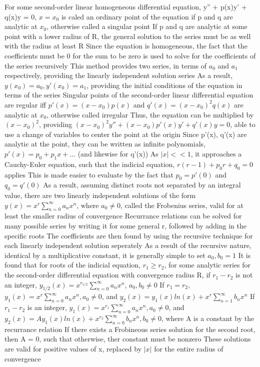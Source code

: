 \documentclass[11 pt, twoside]{article}
\newenvironment{outline*}
{
	\begin{outline}[enumerate]
	}
	{\end{outline}
}
\begin{document}
\begin{outline*}
\1 For some second-order linear homogeneous differential equation, y'' + p(x)y' + q(x)y = 0, $x = x_0$ is caled an ordinary point of the equation if p and q are analytic at $x_0$, otherwise called a singular point
	\2 If p and q are analytic at some point with a lower radius of R, the general solution to the series must be as well with the radius at least R
	\2 Since the equation is homogeneous, the fact that the coefficients must be 0 for the sum to be zero is used to solve for the coefficients of the series recursively
		\3 This method provides two series, in terms of $a_0$ and $a_1$ respectively, providing the linearly independent solution series
		\3 As a result, $y(x_0) = a_0, y'(x_0) = a_1$, providing the initial conditions of the equation in terms of the series
\1 Singular points of the second-order linear differential equation are regular iff $p'(x) = (x - x_0)p(x)$ and $q'(x) = (x - x_0)^2q(x)$ are analytic at $x_0$, otherwise called irregular
	\2 Thus, the equation can be multiplied by $(x - x_0)^2$, providing $(x - x_0)^2y'' + (x - x_0)p'(x)y' + q'(x)y = 0$, able to use a change of variables to center the point at the origin
	\2 Since p'(x), q'(x) are analytic at the point, they can be written as infinite polynomials, $p'(x) = p_0 + p_1x + ...$ (and likewise for q'(x))
		\3 As $|x| << 1$, it approaches a Cauchy-Euler equation, such that the indicial equation, $r(r - 1) + p_0r + q_0 = 0$ applies
			\4 This is made easier to evaluate by the fact that $p_0 = p'(0)$ and $q_0 = q'(0)$
		\3 As a result, assuming distinct roots not separated by an integral value, there are two linearly independent solutions of the form $y(x) = x^r\sum_{n = 0}^{\infty} a_nx^n$, where $a_0 \neq 0$, called the Frobenius series, valid for at least the smaller radius of convergence
		\3 Recurrance relations can be solved for many possible series by writing it for some general r, followed by adding in the specific roots
	\2 The coefficients are then found by using the recursive technique for each linearly independent solution seperately
		\3 As a result of the recursive nature, identical by a multiplicative constant, it is generally simple to set $a_0, b_0 = 1$
\1 It is found that for roots of the indicial equation, $r_1 \geq r_2$, for some analytic series for the second-order differential equation with convergence radius R, if $r_1 - r_2$ is not an integer, $y_{1/2}(x) = x^{r_{1/2}} \sum_{n = 0}^\infty a_n x^n$, $a_0, b_0 \neq 0$
	\2 If $r_1 = r_2$, $y_1(x) = x^r \sum_{n = 0}^\infty a_n x^n, a_0 \neq 0$, and $y_2(x) = y_1(x)ln(x) + x^r \sum_{n = 1}^{\infty} b_n x^n$
	\2 If $r_1 - r_2$ is an integer, $y_1(x) = x^{r_1} \sum_{n = 0}^\infty a_n x^n, a_0 \neq 0$, and $y_2(x) = Ay_1(x)ln(x) + x^{r_2} \sum_{n = 0}^{\infty} b_n x^n, b_0 \neq 0$, where A is a constant by the recurrance relation
		\3 If there exists a Frobineous series solution for the second root, then A = 0, such that otherwise, ther constant must be nonzero
	\2 These solutions are valid for positive values of x, replaced by $|x|$ for the entire radius of convergence
\end{outline*}
\end{document}
